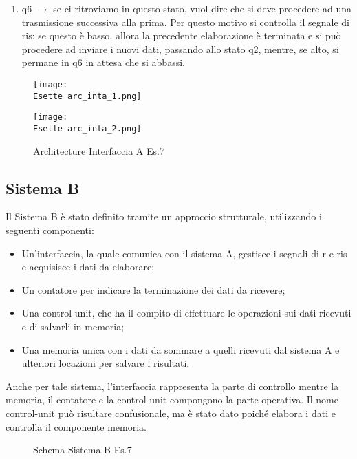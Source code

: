 \documentclass[12pt]{article}
\def \Esette {Allegati/Esercizio7/}
\begin{document}
\begin{enumerate}
    \item q6 $\rightarrow$ se ci ritroviamo in questo stato, vuol dire che si deve procedere ad una trasmissione successiva alla prima. Per questo motivo si controlla il segnale di ris: se questo è basso, allora la precedente elaborazione è terminata e si può procedere ad inviare i nuovi dati, passando allo stato q2, mentre, se alto, si permane in q6 in attesa che si abbassi.
\end{enumerate}
\clearpage
\begin{figure}[ht!]
    \centering
    \texttt{[image: \\Esette arc\_inta\_1.png]}
\end{figure}
\begin{figure}[ht!]
    \centering
    \texttt{[image: \\Esette arc\_inta\_2.png]}
    \caption{Architecture Interfaccia A Es.7}
\end{figure}
\clearpage
\subsection{Sistema B}
Il Sistema B è stato definito tramite un approccio strutturale, utilizzando i seguenti componenti:
\begin{itemize}
    \item Un’interfaccia, la quale comunica con il sistema A, gestisce i segnali di r e ris e acquisisce i dati da elaborare;
    \item Un contatore per indicare la terminazione dei dati da ricevere;
    \item Una control unit, che ha il compito di effettuare le operazioni sui dati ricevuti e di salvarli in memoria;
    \item Una memoria unica con i dati da sommare a quelli ricevuti dal sistema A e ulteriori locazioni per salvare i risultati.
\end{itemize}
Anche per tale sistema, l’interfaccia rappresenta la parte di controllo mentre la memoria, il contatore e la control unit compongono la parte operativa. Il nome control-unit può risultare confusionale, ma è stato dato poiché elabora i dati e controlla il componente memoria.
\begin{figure}[ht!]
    \centering
    
    \caption{Schema Sistema B Es.7}
\end{figure}
\clearpage
\end{document}

